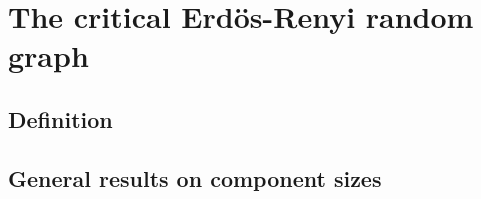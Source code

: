 
\chapter{The critical Erd\"os-Renyi random graph}

\section{Definition}

\section{General results on component sizes}

